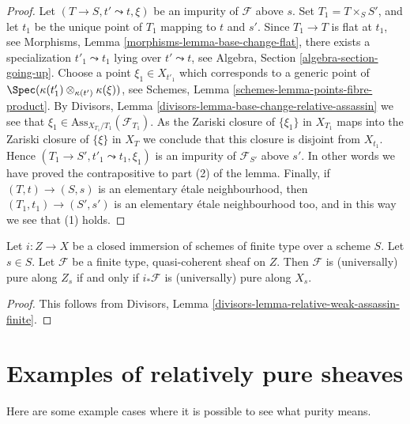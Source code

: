 \begin{proof}
Let $(T \to S, t' \leadsto t, \xi)$ be an impurity of
$\mathcal{F}$ above $s$. Set $T_1 = T \times_S S'$, and let $t_1$
be the unique point of $T_1$ mapping to $t$ and $s'$. Since
$T_1 \to T$ is flat at $t_1$, see
Morphisms, Lemma \ref{morphisms-lemma-base-change-flat},
there exists a specialization $t'_1 \leadsto t_1$ lying over
$t' \leadsto t$, see
Algebra, Section \ref{algebra-section-going-up}.
Choose a point $\xi_1 \in X_{t'_1}$ which corresponds to a generic
point of $\Spec(\kappa(t'_1) \otimes_{\kappa(t')} \kappa(\xi))$, see
Schemes, Lemma \ref{schemes-lemma-points-fibre-product}.
By
Divisors, Lemma \ref{divisors-lemma-base-change-relative-assassin}
we see that $\xi_1 \in \text{Ass}_{X_{T_1}/T_1}(\mathcal{F}_{T_1})$.
As the Zariski closure of $\{\xi_1\}$ in $X_{T_1}$ maps into the
Zariski closure of $\{\xi\}$ in $X_T$ we conclude that
this closure is disjoint from $X_{t_1}$. Hence
$(T_1 \to S', t'_1 \leadsto t_1, \xi_1)$
is an impurity of $\mathcal{F}_{S'}$ above $s'$.
In other words we have proved the contrapositive to part (2) of the
lemma. Finally, if $(T, t) \to (S, s)$ is an elementary
\'etale neighbourhood, then $(T_1, t_1) \to (S', s')$ is an
elementary \'etale neighbourhood too, and in this way we see that (1) holds.
\end{proof}

\begin{lemma}
\label{lemma-supported-on-closed}
Let $i : Z \to X$ be a closed immersion of schemes of finite type over
a scheme $S$. Let $s \in S$. Let $\mathcal{F}$ be a
finite type, quasi-coherent sheaf on $Z$. Then $\mathcal{F}$ is
(universally) pure along $Z_s$ if and only if $i_*\mathcal{F}$
is (universally) pure along $X_s$.
\end{lemma}

\begin{proof}
This follows from
Divisors, Lemma \ref{divisors-lemma-relative-weak-assassin-finite}.
\end{proof}








\section{Examples of relatively pure sheaves}
\label{section-examples-pure-sheaves}

\noindent
Here are some example cases where it is possible to see what purity means.

